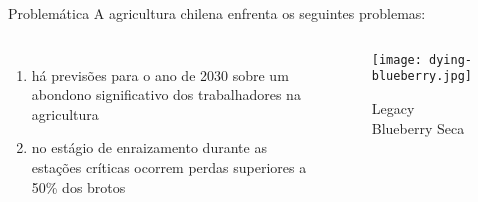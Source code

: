 \begin{frame}[t]{Problemática} 
    \transdissolve[duration=0.5]
    A agricultura chilena enfrenta os seguintes problemas:
        \begin{columns}[t]
                \begin{enumerate}
                    \item há previsões para o ano de 2030 sobre um abondono significativo dos trabalhadores na agricultura
                    \item no estágio de enraizamento durante as estações críticas ocorrem perdas superiores a 50\% dos brotos
                \end{enumerate}
            \vspace{-0.5cm}
            \begin{center}
                \begin{figure}
                    \caption{Legacy Blueberry Seca}
                    \texttt{[image: dying-blueberry.jpg]}
                \end{figure}
            \end{center}
        \end{columns}
\end{frame}
